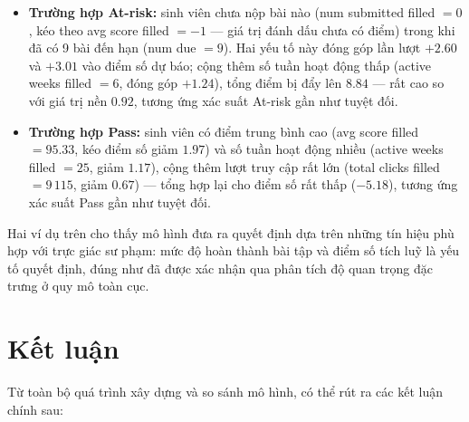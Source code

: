 \documentclass[a4paper]{article}
\newcommand{\code}[1]{{\ttfamily\def\_{\textunderscore\discretionary{}{}{}}#1}}
\def\code#1{#1}%
\def\_{ }%
\begin{document}
\begin{itemize}[leftmargin=*]
  \item \textbf{Trường hợp At-risk:} sinh viên chưa nộp bài nào
        (\code{num\_submitted\_filled} $= 0$, kéo theo \code{avg\_score\_filled}
        $= -1$ --- giá trị đánh dấu chưa có điểm) trong khi đã có 9 bài đến hạn
        (\code{num\_due} $= 9$). Hai yếu tố này đóng góp lần lượt $+2.60$ và
        $+3.01$ vào điểm số dự báo; cộng thêm số tuần hoạt động thấp
        (\code{active\_weeks\_filled} $= 6$, đóng góp $+1.24$), tổng điểm bị
        đẩy lên $8.84$ --- rất cao so với giá trị nền $0.92$, tương ứng xác
        suất At-risk gần như tuyệt đối.
  \item \textbf{Trường hợp Pass:} sinh viên có điểm trung bình cao
        (\code{avg\_score\_filled} $= 95.33$, kéo điểm số giảm $1.97$) và số
        tuần hoạt động nhiều (\code{active\_weeks\_filled} $= 25$, giảm
        $1.17$), cộng thêm lượt truy cập rất lớn
        (\code{total\_clicks\_filled} $= 9\,115$, giảm $0.67$) --- tổng hợp
        lại cho điểm số rất thấp ($-5.18$), tương ứng xác suất Pass gần như
        tuyệt đối.
\end{itemize}

Hai ví dụ trên cho thấy mô hình đưa ra quyết định dựa trên những tín hiệu phù
hợp với trực giác sư phạm: mức độ hoàn thành bài tập và điểm số tích luỹ là
yếu tố quyết định, đúng như đã được xác nhận qua phân tích độ quan trọng đặc
trưng ở quy mô toàn cục.

\section{Kết luận}

Từ toàn bộ quá trình xây dựng và so sánh mô hình, có thể rút ra các kết luận
chính sau:
\end{document}
